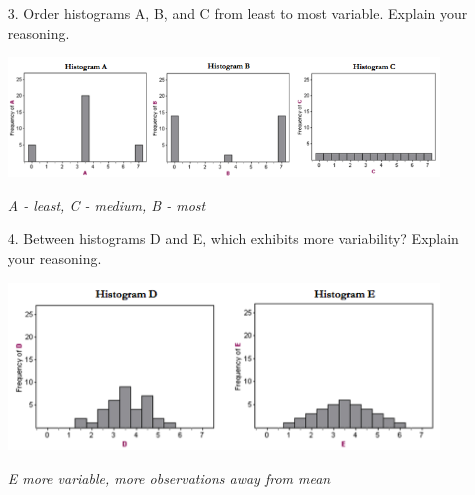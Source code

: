 \documentclass[12pt]{article}
\newcommand{\soln}[2]{\textit{\textcolor{custom_red}{#2}}}{}
\begin{document}
\begin{enumerate}[resume]

\item[3.] Order histograms A, B, and C from least to most variable. Explain your reasoning.

\includegraphics[width=0.9\textwidth]{figures/histogramsVarOrderABC}

\soln{2cm}{A - least, C - medium, B - most}

\item[4.] Between histograms D and E, which exhibits more variability? Explain your reasoning.

\includegraphics[width=0.9\textwidth]{figures/histogramsVarOrderDE}

\soln{2cm}{E more variable, more observations away from mean}

\end{enumerate}
\end{document}
